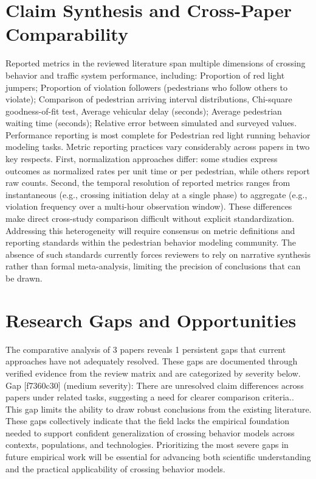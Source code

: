 \documentclass{article}
\begin{document}
\section{Claim Synthesis and Cross-Paper Comparability}
Reported metrics in the reviewed literature span multiple dimensions of crossing behavior and traffic system performance, including: Proportion of red light jumpers; Proportion of violation followers (pedestrians who follow others to violate); Comparison of pedestrian arriving interval distributions, Chi-square goodness-of-fit test, Average vehicular delay (seconds); Average pedestrian waiting time (seconds); Relative error between simulated and surveyed values. Performance reporting is most complete for Pedestrian red light running behavior modeling tasks. Metric reporting practices vary considerably across papers in two key respects. First, normalization approaches differ: some studies express outcomes as normalized rates per unit time or per pedestrian, while others report raw counts. Second, the temporal resolution of reported metrics ranges from instantaneous (e.g., crossing initiation delay at a single phase) to aggregate (e.g., violation frequency over a multi-hour observation window). These differences make direct cross-study comparison difficult without explicit standardization. Addressing this heterogeneity will require consensus on metric definitions and reporting standards within the pedestrian behavior modeling community. The absence of such standards currently forces reviewers to rely on narrative synthesis rather than formal meta-analysis, limiting the precision of conclusions that can be drawn.

\section{Research Gaps and Opportunities}
The comparative analysis of 3 papers reveals 1 persistent gaps that current approaches have not adequately resolved. These gaps are documented through verified evidence from the review matrix and are categorized by severity below. Gap [f7360c30] (medium severity): There are unresolved claim differences across papers under related tasks, suggesting a need for clearer comparison criteria.. This gap limits the ability to draw robust conclusions from the existing literature. These gaps collectively indicate that the field lacks the empirical foundation needed to support confident generalization of crossing behavior models across contexts, populations, and technologies. Prioritizing the most severe gaps in future empirical work will be essential for advancing both scientific understanding and the practical applicability of crossing behavior models.
\end{document}

